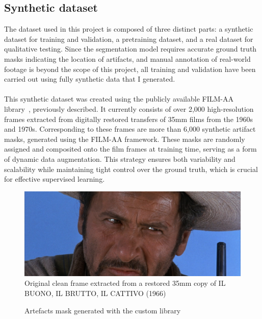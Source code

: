 \documentclass[openany, 12pt]{article}
\begin{document}
	\subsection{Synthetic dataset}
	The dataset used in this project is composed of three distinct parts: a synthetic dataset for training and validation, a pretraining dataset, and a real dataset for qualitative testing. Since the segmentation model requires accurate ground truth masks indicating the location of artifacts, and manual annotation of real-world footage is beyond the scope of this project, all training and validation have been carried out using fully synthetic data that I generated.\\\\
	This synthetic dataset was created using the publicly available FILM-AA library~\cite{ivanova23analogue}, previously described. It currently consists of over 2,000 high-resolution frames extracted from digitally restored transfers of 35mm films from the 1960s and 1970s. Corresponding to these frames are more than 6,000 synthetic artifact masks, generated using the FILM-AA framework. These masks are randomly assigned and composited onto the film frames at training time, serving as a form of dynamic data augmentation. This strategy ensures both variability and scalability while maintaining tight control over the ground truth, which is crucial for effective supervised learning.
	\begin{figure}[h!]
		\centering
		\includegraphics[width=0.7\linewidth]{images/bueno_feo_malo_frame_0131.png}
		\caption{\smaller Original clean frame extracted from a restored 35mm copy of IL BUONO, IL BRUTTO, IL CATTIVO (1966)} 
	\end{figure}
		\begin{figure}[h!]
		\centering
		\caption{\smaller Artefacts mask generated with the custom library} 
	\end{figure}\\
\end{document}
